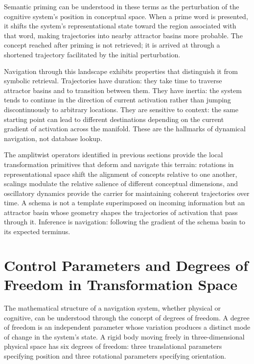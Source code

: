 \documentclass[11pt, a4paper]{article}
\theoremstyle{plain}
\theoremstyle{definition}
\theoremstyle{remark}
\begin{document}
Semantic priming can be understood in these terms as the perturbation of the cognitive
system's position in conceptual space. When a prime word is presented, it shifts the
system's representational state toward the region associated with that word, making
trajectories into nearby attractor basins more probable. The concept reached after
priming is not retrieved; it is arrived at through a shortened trajectory facilitated
by the initial perturbation.

Navigation through this landscape exhibits properties that distinguish it from symbolic
retrieval. Trajectories have duration: they take time to traverse attractor basins and
to transition between them. They have inertia: the system tends to continue in the
direction of current activation rather than jumping discontinuously to arbitrary
locations. They are sensitive to context: the same starting point can lead to different
destinations depending on the current gradient of activation across the manifold.
These are the hallmarks of dynamical navigation, not database lookup.

The amplitwist operators identified in previous sections provide the local transformation
primitives that deform and navigate this terrain: rotations in representational space
shift the alignment of concepts relative to one another, scalings modulate the relative
salience of different conceptual dimensions, and oscillatory dynamics provide the carrier
for maintaining coherent trajectories over time. A schema is not a template superimposed
on incoming information but an attractor basin whose geometry shapes the trajectories
of activation that pass through it. Inference is navigation: following the gradient of
the schema basin to its expected terminus.


\section{Control Parameters and Degrees of Freedom in Transformation Space}

The mathematical structure of a navigation system, whether physical or cognitive, can
be understood through the concept of degrees of freedom. A degree of freedom is an
independent parameter whose variation produces a distinct mode of change in the system's
state. A rigid body moving freely in three-dimensional physical space has six degrees of
freedom: three translational parameters specifying position and three rotational
parameters specifying orientation.
\end{document}
